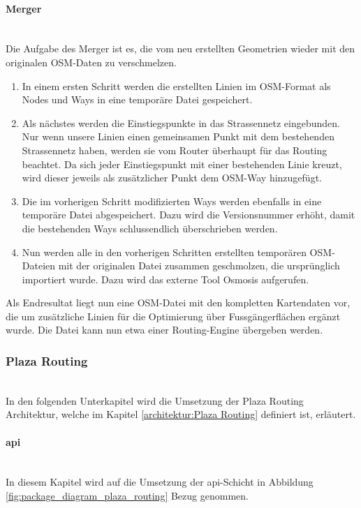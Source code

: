 \paragraph{Merger}\label{impl:Merger}~\\
Die Aufgabe des Merger ist es, die vom  neu erstellten Geometrien wieder mit den originalen \ac{OSM}-Daten zu verschmelzen.
\begin{enumerate}
    \item In einem ersten Schritt werden die erstellten Linien im \ac{OSM}-Format als Nodes und Ways in eine temporäre Datei gespeichert.
    \item Als nächstes werden die Einstiegspunkte in das Strassennetz eingebunden. Nur wenn unsere Linien einen gemeinsamen Punkt mit dem bestehenden Strassennetz haben, werden sie vom Router überhaupt für das Routing beachtet. Da sich jeder Einstiegspunkt mit einer bestehenden Linie kreuzt, wird dieser jeweils als zusätzlicher Punkt dem \ac{OSM}-Way hinzugefügt.
    \item Die im vorherigen Schritt modifizierten Ways werden ebenfalls in eine temporäre Datei abgespeichert. Dazu wird die Versionsnummer erhöht, damit die bestehenden Ways schlussendlich überschrieben werden.
    \item Nun werden alle in den vorherigen Schritten erstellten temporären \ac{OSM}-Dateien mit der originalen Datei zusammen geschmolzen, die ursprünglich importiert wurde. Dazu wird das externe Tool Osmosis \cite{osmosis} aufgerufen.
\end{enumerate}

Als Endresultat liegt nun eine \ac{OSM}-Datei mit den kompletten Kartendaten vor, die um zusätzliche Linien für die Optimierung über Fussgängerflächen ergänzt wurde. Die Datei kann nun etwa einer Routing-Engine übergeben werden.

\subsubsection{Plaza Routing}~\\
\label{impl:Plaza Routing}
In den folgenden Unterkapitel wird die Umsetzung der Plaza Routing Architektur, welche im Kapitel \ref{architektur:Plaza Routing} definiert ist, erläutert. 

\paragraph{api}\label{impl:Plaza Routing api}~\\
In diesem Kapitel wird auf die Umsetzung der api-Schicht in Abbildung \ref{fig:package_diagram_plaza_routing} Bezug genommen.


